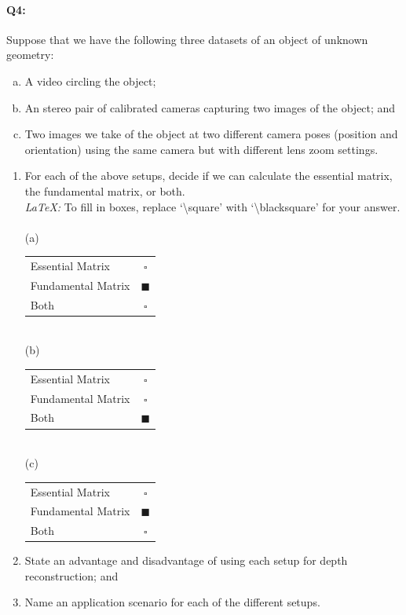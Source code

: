 \pagebreak
\paragraph{Q4:}
Suppose that we have the following three datasets of an object of unknown geometry:
\begin{enumerate}[(a)]
    \item A video circling the object;
    \item An stereo pair of calibrated cameras capturing two images of the object; and
    \item Two images we take of the object at two different camera poses (position and orientation) using the same camera but with different lens zoom settings.
\end{enumerate}

\begin{enumerate}
    \item For each of the above setups, decide if we can calculate the essential matrix, the fundamental matrix, or both. \\
          \emph{LaTeX:} To fill in boxes, replace `\textbackslash square' with `\textbackslash blacksquare' for your answer. \\ \\
          (a)
          \begin{tabular}[h]{lc}
              \toprule
              Essential Matrix   & $\square$      \\
              Fundamental Matrix & $\blacksquare$ \\
              Both               & $\square$      \\
          \end{tabular} \\
          (b)
          \begin{tabular}[h]{lc}
              \toprule
              Essential Matrix   & $\square$      \\
              Fundamental Matrix & $\square$      \\
              Both               & $\blacksquare$ \\
          \end{tabular} \\
          (c)
          \begin{tabular}[h]{lc}
              \toprule
              Essential Matrix   & $\square$      \\
              Fundamental Matrix & $\blacksquare$ \\
              Both               & $\square$      \\
              \bottomrule
          \end{tabular}
    \item State an advantage and disadvantage of using each setup for depth reconstruction; and
    \item Name an application scenario for each of the different setups.
\end{enumerate}

